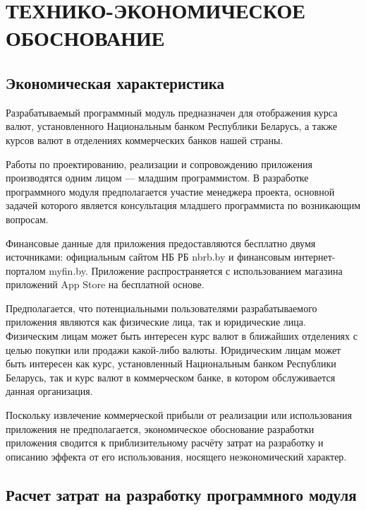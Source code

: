 \section[Технико-экономическое обоснование]{ТЕХНИКО-ЭКОНОМИЧЕСКОЕ ОБОСНОВАНИЕ}

\label{sec:teo}


\subsection{Экономическая характеристика}

Разрабатываемый программный модуль предназначен для отображения курса валют,
установленного Национальным банком Республики Беларусь, а также курсов
валют в отделениях коммерческих банков нашей страны.

Работы по проектированию, реализации и сопровождению приложения
производятся одним лицом --- младшим программистом.
В разработке программного модуля предполагается участие менеджера проекта,
основной задачей которого является консультация младшего программиста
по возникающим вопросам.

Финансовые данные для приложения предоставляются бесплатно двумя источниками:
официальным сайтом НБ РБ nbrb.by и финансовым интернет-порталом myfin.by.
Приложение распространяется с использованием магазина приложений App Store
на бесплатной основе.

Предполагается, что потенциальными пользователями разрабатываемого приложения
являются как физические лица, так и юридические лица. Физическим лицам может
быть интересен курс валют в ближайших отделениях с целью покупки или
продажи какой-либо валюты.
Юридическим лицам может быть интересен как курс, установленный Национальным
банком Республики Беларусь, так и курс валют в коммерческом банке,
в котором обслуживается данная организация.

Поскольку извлечение коммерческой прибыли от реализации или использования приложения
не предполагается, экономическое обоснование разработки приложения
сводится к приблизительному расчёту затрат на разработку и
описанию эффекта от его использования, носящего неэкономический характер.



\subsection{Расчет затрат на разработку программного модуля}

